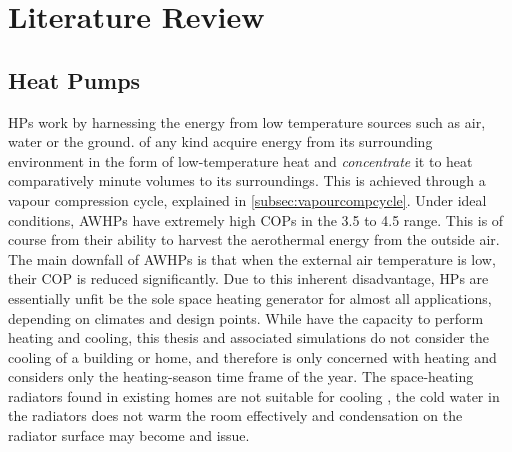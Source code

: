 \chapter{Literature Review}\label{ch:litreview}



\section{Heat Pumps} \label{sec:heatpumps}
\acp{HP} work by harnessing the energy from low temperature sources such as air, water or the ground. \HPs of any kind acquire energy from its surrounding environment in the form of low-temperature heat and \textit{concentrate} it to heat comparatively minute volumes to its surroundings. This is achieved through a vapour compression cycle, explained in \cref{subsec:vapourcompcycle}. Under ideal conditions, \acp{AWHP} have extremely high \acp{COP} in the \num{3.5} to \num{4.5} range. This is of course from their ability to harvest the aerothermal energy from the outside air. The main downfall of \acp{AWHP} is that when the external air temperature is low, their \ac{COP} is reduced significantly. Due to this inherent disadvantage, \acp{HP} are essentially unfit be the sole space heating generator for almost all applications, depending on climates and design points. While \HPs have the capacity to perform heating and cooling, this thesis and associated simulations do not consider the cooling of a building or home, and therefore is only concerned with heating and considers only the heating-season time frame of the year. The space-heating radiators found in existing homes are not suitable for cooling \cite{klein_numerical_2014}, the cold water in the radiators does not warm the room effectively and condensation on the radiator surface may become and issue. 

